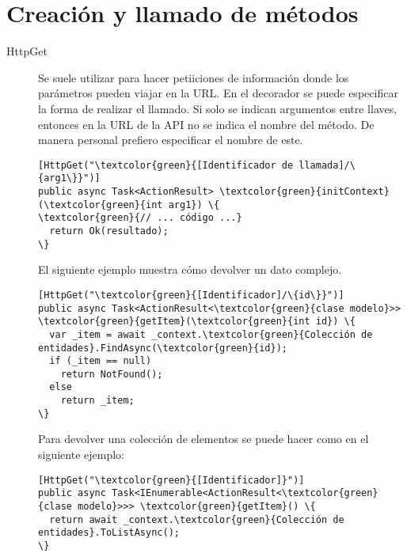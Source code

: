 \documentclass[11pt]{article} %
\begin{document}
\section{Creación y llamado de métodos}
\begin{description}
\item[HttpGet] Se suele utilizar para hacer petiiciones de información donde los parámetros pueden viajar en la URL. En el decorador se puede especificar la forma de realizar el llamado. Si solo se indican argumentos entre llaves, entonces en la URL de la API no se indica el nombre del método. De manera personal prefiero especificar el nombre de este.
\begin{Verbatim}[commandchars=\\\{\}]
[HttpGet("\textcolor{green}{[Identificador de llamada]/\{arg1\}}")]
public async Task<ActionResult> \textcolor{green}{initContext}(\textcolor{green}{int arg1}) \{
\textcolor{green}{// ... código ...}
  return Ok(resultado);
\}
\end{Verbatim}
El siguiente ejemplo muestra cómo devolver un dato complejo.
\begin{Verbatim}[commandchars=\\\{\}]
[HttpGet("\textcolor{green}{[Identificador]/\{id\}}")]
public async Task<ActionResult<\textcolor{green}{clase modelo}>> \textcolor{green}{getItem}(\textcolor{green}{int id}) \{
  var _item = await _context.\textcolor{green}{Colección de entidades}.FindAsync(\textcolor{green}{id});
  if (_item == null)
    return NotFound();
  else
    return _item;
\}
\end{Verbatim}
Para devolver una colección de elementos se puede hacer como en el siguiente ejemplo:
\begin{Verbatim}[commandchars=\\\{\}]
[HttpGet("\textcolor{green}{[Identificador]}")]
public async Task<IEnumerable<ActionResult<\textcolor{green}{clase modelo}>>> \textcolor{green}{getItem}() \{
  return await _context.\textcolor{green}{Colección de entidades}.ToListAsync();
\}
\end{Verbatim}


\end{description}
\end{document}
